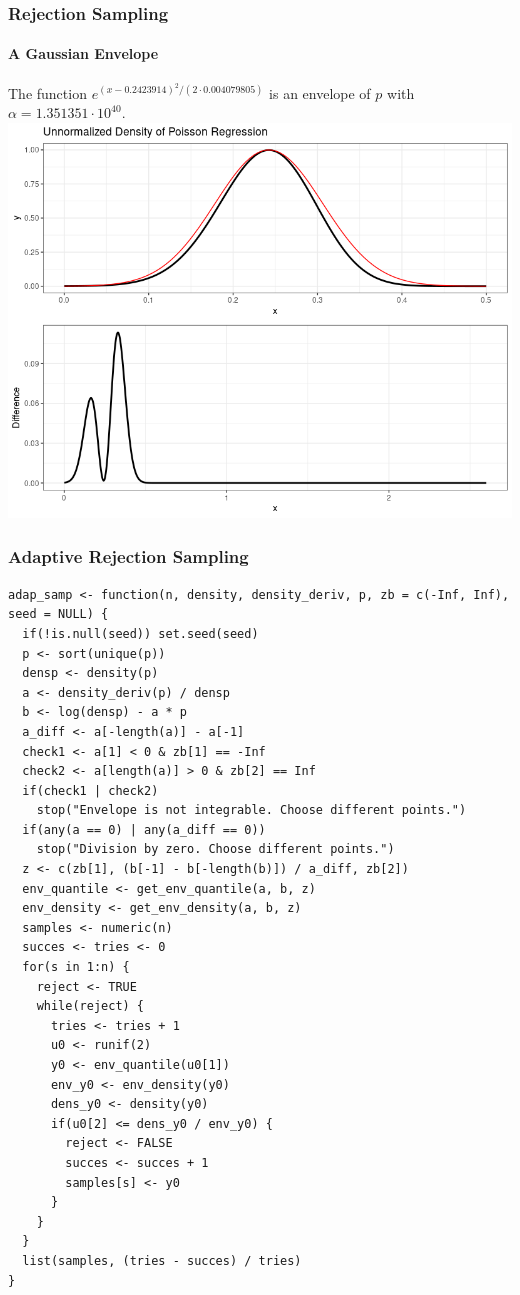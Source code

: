 \documentclass[aspectratio=169]{beamer}
\begin{document}
\begin{frame}
  \frametitle{Rejection Sampling}
  \framesubtitle{A Gaussian Envelope}
  The function $e^{(x - 0.2423914)^{2}/(2 \cdot 0.004079805)}$ is an envelope of $p$ with $\alpha = 1.351351\cdot 10^{40}$.
  \centering
  \includegraphics[scale = 0.4]{figure/GaussEnvelope.png}
\end{frame}
\begin{frame}[fragile]
  \frametitle{Adaptive Rejection Sampling}
\begin{verbatim}
adap_samp <- function(n, density, density_deriv, p, zb = c(-Inf, Inf), seed = NULL) {
  if(!is.null(seed)) set.seed(seed)
  p <- sort(unique(p))
  densp <- density(p)
  a <- density_deriv(p) / densp
  b <- log(densp) - a * p
  a_diff <- a[-length(a)] - a[-1]
  check1 <- a[1] < 0 & zb[1] == -Inf
  check2 <- a[length(a)] > 0 & zb[2] == Inf
  if(check1 | check2)
    stop("Envelope is not integrable. Choose different points.")
  if(any(a == 0) | any(a_diff == 0))
    stop("Division by zero. Choose different points.")
  z <- c(zb[1], (b[-1] - b[-length(b)]) / a_diff, zb[2])
  env_quantile <- get_env_quantile(a, b, z)
  env_density <- get_env_density(a, b, z)
  samples <- numeric(n)
  succes <- tries <- 0
  for(s in 1:n) {
    reject <- TRUE
    while(reject) {
      tries <- tries + 1
      u0 <- runif(2)
      y0 <- env_quantile(u0[1])
      env_y0 <- env_density(y0)
      dens_y0 <- density(y0)
      if(u0[2] <= dens_y0 / env_y0) {
        reject <- FALSE
        succes <- succes + 1
        samples[s] <- y0
      }
    }
  }
  list(samples, (tries - succes) / tries)
}
\end{verbatim}
\end{frame}
\end{document}
